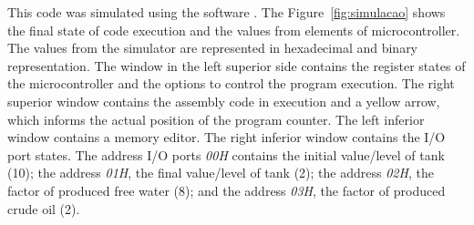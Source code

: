 \documentclass[11pt]{article} %
\begin{document}
This code was simulated using the software \cite{Simulator_z80}. The
Figure~\ref{fig:simulacao} shows the final state of code execution and the values
from elements of microcontroller. The values from the simulator are represented
in hexadecimal and binary representation. The window in the left superior side
contains the register states of the microcontroller and the options to control
the program execution. The right superior window contains the assembly code in
execution and a yellow arrow, which informs the actual position of the program
counter. The left inferior window contains a memory editor. The right inferior
window contains the I/O port states.
The address I/O ports \textit{00H} contains the initial value/level of tank (10);
the address \textit{01H}, the final value/level of tank (2); the address
\textit{02H}, the factor of produced free water (8); and the address
\textit{03H}, the factor of produced crude oil (2).


\end{document}
